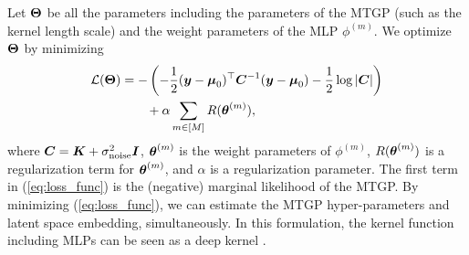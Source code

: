 Let 
$\boldsymbol{\Theta}$
be all the parameters including the parameters of the MTGP (such as the kernel length scale) and the weight parameters of the MLP 
$\phi^{(m)}$.
%
We optimize $\boldsymbol{\Theta}$ by minimizing 
\begin{align}
 {\mathcal L}(\boldsymbol{\Theta}) 
 &=  
 -\left(- \frac{1}{2}
 (\boldsymbol{y} - \boldsymbol{\mu}_0)^\top \boldsymbol{C}^{-1} (\boldsymbol{y} - \boldsymbol{\mu}_0)
 - \frac{1}{2}\log \left| \boldsymbol{C} \right|\right) 
 \notag \\
 & \qquad
 + \alpha \sum_{m \in [M]} R(\boldsymbol{\theta}^{(m)}), 
 \label{eq:loss_func}
\end{align}
where 
$\boldsymbol{C} = \boldsymbol{K} + \sigma_{\rm noise}^2 \boldsymbol{I}$,
$\boldsymbol{\theta}^{(m)}$ is the weight parameters of
$\phi^{(m)}$, 
$R(\boldsymbol{\theta}^{(m)})$ 
is a regularization term for
$\boldsymbol{\theta}^{(m)}$, 
and
$\alpha$ 
is a regularization parameter.
%
%
The first term in (\ref{eq:loss_func}) is the (negative) marginal likelihood of the MTGP. 
%
By minimizing (\ref{eq:loss_func}), we can estimate the MTGP hyper-parameters and latent space embedding, simultaneously.
%
In this formulation, the kernel function including MLPs can be seen as a deep kernel \cite{wilson16deep}.

